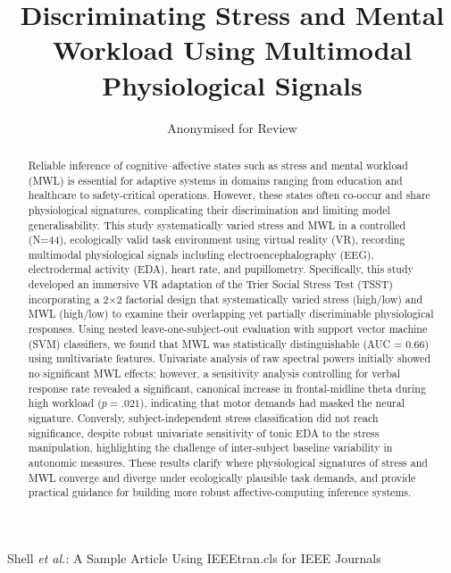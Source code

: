 \documentclass[lettersize,journal]{IEEEtran}
\begin{document}
\title{Discriminating Stress and Mental Workload Using Multimodal Physiological Signals}

\author{Anonymised for Review}

%
{Shell \MakeLowercase{\textit{et al.}}: A Sample Article Using IEEEtran.cls for IEEE Journals}

\maketitle


\begin{abstract}
Reliable inference of cognitive–affective states such as stress and mental workload (MWL) is essential for adaptive systems in domains ranging from education and healthcare to safety-critical operations. However, these states often co-occur and share physiological signatures, complicating their discrimination and limiting model generalisability. This study systematically varied stress and MWL in a controlled (N=44), ecologically valid task environment using virtual reality (VR), recording multimodal physiological signals including electroencephalography (EEG), electrodermal activity (EDA), heart rate, and pupillometry. Specifically, this study developed an immersive VR adaptation of the Trier Social Stress Test (TSST) incorporating a 2×2 factorial design that systematically varied stress (high/low) and MWL (high/low) to examine their overlapping yet partially discriminable physiological responses. Using nested leave-one-subject-out evaluation with support vector machine (SVM) classifiers, we found that MWL was statistically distinguishable (AUC = 0.66) using multivariate features. Univariate analysis of raw spectral powers initially showed no significant MWL effects; however, a sensitivity analysis controlling for verbal response rate revealed a significant, canonical increase in frontal-midline theta during high workload ($p=.021$), indicating that motor demands had masked the neural signature. Conversly, subject-independent stress classification did not reach significance, despite robust univariate sensitivity of tonic EDA to the stress manipulation, highlighting the challenge of inter-subject baseline variability in autonomic measures. These results clarify where physiological signatures of stress and MWL converge and diverge under ecologically plausible task demands, and provide practical guidance for building more robust affective-computing inference systems.
\end{abstract}
\end{document}
